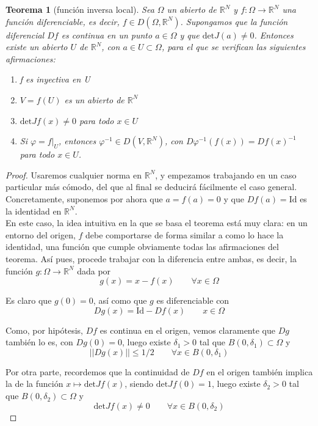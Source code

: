 \documentclass[a4paper, 12pt]{article}
\newtheorem*{teorema*}{Teorema}
\begin{document}
\begin{enumerate}[label=\textbf{\arabic*}.]
\begin{teorema*}[función inversa local]
Sea \(\Omega\) un abierto de \(\mathbb{R}^N\) y \(f: \Omega \to \mathbb{R}^N\) una función diferenciable, es decir, \(f \in D(\Omega, \mathbb{R}^N)\). Supongamos que la función diferencial \(Df\) es continua en un punto \(a \in \Omega\) y que \(\text{det}J(a) \neq 0\). Entonces existe un abierto \(U\) de \(\mathbb{R}^N\), con \(a \in U \subset \Omega\), para el que se verifican las siguientes afirmaciones:
\begin{enumerate}[label=(\textit{\roman*})]
	\item f es inyectiva en U
	\item \( V = f(U)\) es un abierto de \(\mathbb{R}^N\)
	\item \(\text{det}Jf(x) \neq 0\) para todo \(x \in U\)
	\item Si \(\varphi = f|_U\), entonces \(\varphi^{-1} \in D(V, \mathbb{R}^N)\), con \(D \varphi^{-1} (f(x)) = Df(x)^{-1}\) para todo \(x \in U\).
\end{enumerate}
\end{teorema*}

\begin{proof}
Usaremos cualquier norma en \(\mathbb{R}^N\), y empezamos trabajando en un caso particular más cómodo, del que al final se deducirá fácilmente el caso general. Concretamente, suponemos por ahora que \(a = f(a) = 0\) y que \(Df(a) = \text{Id}\) es la identidad en \(\mathbb{R}^N\). \\

En este caso, la idea intuitiva en la que se basa el teorema está muy clara: en un entorno del origen, \(f\) debe comportarse de forma similar a como lo hace la identidad, una función que cumple obviamente todas las afirmaciones del teorema. Así pues, procede trabajar con la diferencia entre ambas, es decir, la función \(g: \Omega \to \mathbb{R}^N\) dada por
\[
	g(x) = x - f(x) \qquad \forall x \in \Omega
\]

Es claro que \(g(0) = 0 \), así como que \(g\) es diferenciable con
\[
	Dg(x) = \text{Id} - Df(x) \qquad x \in \Omega
\]

Como, por hipótesis, \(Df\) es continua en el origen, vemos claramente que \(Dg\) también lo es, con \(Dg(0) = 0\), luego existe \(\delta_1 > 0\) tal que \(B (0, \delta_1) \subset \Omega\) y
\[
	||Dg(x)|| \leq 1/2 \qquad \forall x \in B(0 ,\delta_1)
\]

Por otra parte, recordemos que la continuidad de \(Df\) en el origen también implica la de la función \(x \mapsto \text{det}Jf(x)\), siendo \(\text{det}Jf(0) = 1\), luego existe \(\delta_2 > 0\) tal que \(B(0, \delta_2) \subset \Omega\) y 
\[
	\text{det}Jf(x) \neq 0 \qquad \forall x \in B(0, \delta_2)
\]


\end{proof}
\end{enumerate}
\end{document}
